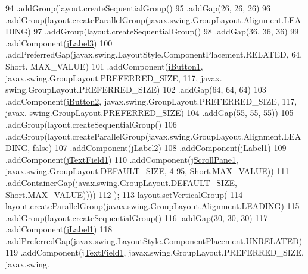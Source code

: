 \begin{DoxyCode}
94             .addGroup(layout.createSequentialGroup()
95                 .addGap(26, 26, 26)
96                 .addGroup(layout.createParallelGroup(javax.swing.GroupLayout.Alignment.LEADING)
97                     .addGroup(layout.createSequentialGroup()
98                         .addGap(36, 36, 36)
99                         .addComponent(\mbox{\hyperlink{classpecl2ignacioribera_1_1_libreria_ad4888d81e2513361bb8f3e6c3cb6c7b2}{jLabel3}})
100                         .addPreferredGap(javax.swing.LayoutStyle.ComponentPlacement.RELATED, 64, Short.
      MAX\_VALUE)
101                         .addComponent(\mbox{\hyperlink{classpecl2ignacioribera_1_1_libreria_a50c2a801f0096a4409e9348d6df5cd09}{jButton1}}, javax.swing.GroupLayout.PREFERRED\_SIZE, 117, javax.
      swing.GroupLayout.PREFERRED\_SIZE)
102                         .addGap(64, 64, 64)
103                         .addComponent(\mbox{\hyperlink{classpecl2ignacioribera_1_1_libreria_a56f076c83a5c4630f48f3f6ccc764d90}{jButton2}}, javax.swing.GroupLayout.PREFERRED\_SIZE, 117, javax.
      swing.GroupLayout.PREFERRED\_SIZE)
104                         .addGap(55, 55, 55))
105                     .addGroup(layout.createSequentialGroup()
106                         .addGroup(layout.createParallelGroup(javax.swing.GroupLayout.Alignment.LEADING, \textcolor{keyword}{
      false})
107                             .addComponent(\mbox{\hyperlink{classpecl2ignacioribera_1_1_libreria_ae67eba9f888cfa9d81bf5823148df302}{jLabel2}})
108                             .addComponent(\mbox{\hyperlink{classpecl2ignacioribera_1_1_libreria_a157484d22a442a3a7ad766b199664464}{jLabel1}})
109                             .addComponent(\mbox{\hyperlink{classpecl2ignacioribera_1_1_libreria_a52881904469d52cd74871578aa7a6a87}{jTextField1}})
110                             .addComponent(\mbox{\hyperlink{classpecl2ignacioribera_1_1_libreria_aae2f0b8fdb27291df13ef48000cf977a}{jScrollPane1}}, javax.swing.GroupLayout.DEFAULT\_SIZE, 4
      95, Short.MAX\_VALUE))
111                         .addContainerGap(javax.swing.GroupLayout.DEFAULT\_SIZE, Short.MAX\_VALUE))))
112         );
113         layout.setVerticalGroup(
114             layout.createParallelGroup(javax.swing.GroupLayout.Alignment.LEADING)
115             .addGroup(layout.createSequentialGroup()
116                 .addGap(30, 30, 30)
117                 .addComponent(\mbox{\hyperlink{classpecl2ignacioribera_1_1_libreria_a157484d22a442a3a7ad766b199664464}{jLabel1}})
118                 .addPreferredGap(javax.swing.LayoutStyle.ComponentPlacement.UNRELATED)
119                 .addComponent(\mbox{\hyperlink{classpecl2ignacioribera_1_1_libreria_a52881904469d52cd74871578aa7a6a87}{jTextField1}}, javax.swing.GroupLayout.PREFERRED\_SIZE, javax.swing.

\end{DoxyCode}
